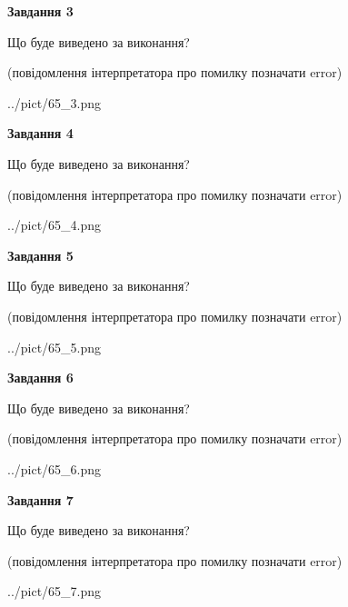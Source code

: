 \documentclass[12pt, ukrainian]{article}
\begin{document}
{\begin {large}
{\begin {center}\textbf{Завдання 3}\end {center}}\par
Що буде виведено за виконання?\par
 (повідомлення інтерпретатора про помилку позначати error)\par
\begin{center}
	{../pict/65_3.png}
\end{center}
\newpage

{\begin {center}\textbf{Завдання 4}\end {center}}\par
Що буде виведено за виконання?\par
 (повідомлення інтерпретатора про помилку позначати error)\par
\begin{center}
	{../pict/65_4.png}
\end{center}
\newpage

{\begin {center}\textbf{Завдання 5}\end {center}}\par
Що буде виведено за виконання?\par
 (повідомлення інтерпретатора про помилку позначати error)\par
\begin{center}
	{../pict/65_5.png}
\end{center}
\newpage

{\begin {center}\textbf{Завдання 6}\end {center}}\par
Що буде виведено за виконання?\par
 (повідомлення інтерпретатора про помилку позначати error)\par
\begin{center}
	{../pict/65_6.png}
\end{center}
\newpage

{\begin {center}\textbf{Завдання 7}\end {center}}\par
Що буде виведено за виконання?\par
 (повідомлення інтерпретатора про помилку позначати error)\par
\begin{center}
	{../pict/65_7.png}
\end{center}
\newpage


\end{large}}
\end{document}
